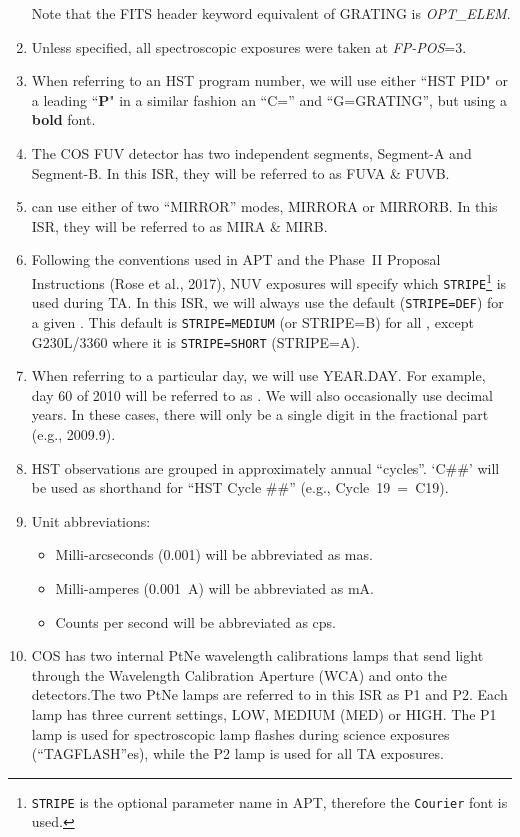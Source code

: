 \begin{enumerate}
{	Note that the FITS header keyword equivalent of GRATING is \textit{OPT\_ELEM}.}
	\item{Unless specified, all spectroscopic exposures were taken at \textit{FP-POS}=3.}
	\item{When referring to an HST program number, we will use either ``HST PID" or a leading ``{\bf P}" in a similar fashion an ``C=\cenwave'' and ``G=GRATING'', but using a {\bf bold} font.}
	\item{The COS FUV detector has two independent segments, Segment-A and Segment-B. In this ISR, they will be referred to as FUVA \& FUVB.}
	\item{ can use either of two ``MIRROR'' modes, MIRRORA or MIRRORB. In this ISR, they will be referred to as MIRA \& MIRB.}
	\item{Following the conventions used in APT and the Phase~II Proposal Instructions (Rose et al., 2017), NUV  exposures will specify which \texttt{STRIPE}\footnote{\texttt{STRIPE} is the optional parameter name in APT, therefore the \texttt{Courier} font is used.} is used during TA. In this ISR, we will always use
	the default (\texttt{STRIPE=DEF}) for a given \cenwave. This default is \texttt{STRIPE=MEDIUM} (or STRIPE=B) for all \cenwaves, except G230L/3360 where it is \texttt{STRIPE=SHORT} (STRIPE=A).}
	\item{When referring to a particular day, we will use YEAR.DAY. For example, day 60 of 2010 will be referred to as \psiafdate. We will also occasionally use decimal years. In these cases, there will only be a single digit in the fractional part (e.g., 2009.9).}
	\item{HST observations are grouped in approximately annual ``cycles''. `C\#\#' will be used as shorthand for ``HST Cycle \#\#'' (e.g., Cycle~19~=~C19).}
	\item{Unit abbreviations:
		\begin{itemize}
		\item{Milli-arcseconds (0.001\arcsec) will be abbreviated as mas.}
		\item{Milli-amperes (0.001~A) will be abbreviated as mA.}
		\item{Counts per second will be abbreviated as cps.}
		\end{itemize}
	}
	\item{COS has two internal PtNe wavelength calibrations lamps that send light through the Wavelength Calibration Aperture (WCA) and onto the detectors.The two PtNe lamps are referred to in this ISR
	as P1 and P2. Each lamp has three current settings, LOW, MEDIUM (MED) or HIGH. The P1 lamp is used for spectroscopic lamp flashes during science exposures (``TAGFLASH''es), while the P2 lamp is used for all TA exposures.
}
\end{enumerate}

